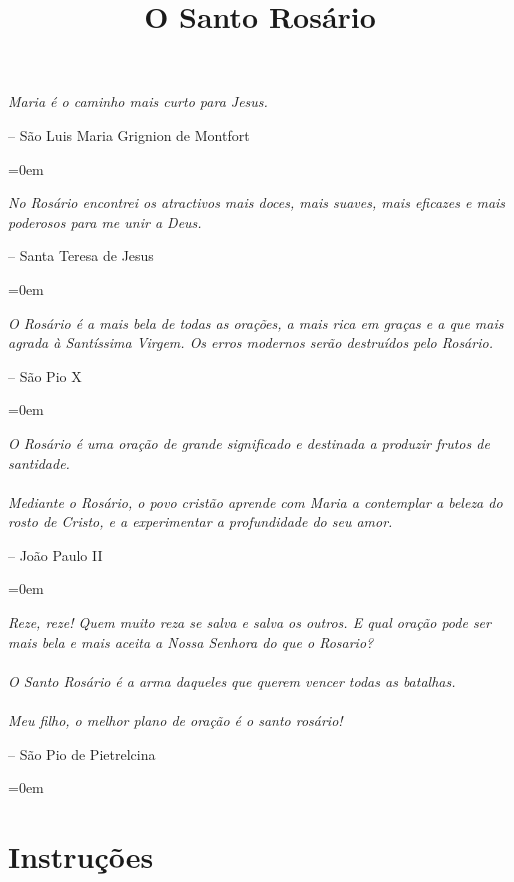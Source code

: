 \documentclass[10pt,a5paper]{book}
\newcommand{\epigraph}[2]{%
    \leftskip=0.3\textwidth \emph{#1}

    \leftskip=0.3\textwidth \hfill -- #2

    \leftskip=0em ~
}
\newenvironment{specialpage}{\mbox{} \vfill}{\vfill \mbox{}}
\begin{document}
\title{O Santo Rosário}
\author{}
\date{}

\pagestyle{empty}

\begin{specialpage}
    \begin{center}
        
    \end{center}
\end{specialpage}

\cleardoublepage

\begin{specialpage}
    \epigraph{Maria é o caminho mais curto para Jesus.}{São Luis Maria Grignion de Montfort}

    \vfill

    \epigraph{No Rosário encontrei os atractivos mais doces, mais suaves, mais eficazes e mais poderosos para me unir a Deus.}{Santa Teresa de Jesus}

    \epigraph{O Rosário é a mais bela de todas as orações, a mais rica em graças e a que mais agrada à Santíssima Virgem.
    Os erros modernos serão destruídos pelo Rosário.}{São Pio X}

    \vfill

    \epigraph{O Rosário é uma oração de grande significado e destinada a produzir frutos de santidade. \\ \\
    Mediante o Rosário, o povo cristão aprende com Maria a contemplar a beleza do rosto de Cristo, e a experimentar a profundidade do seu amor.}{João Paulo II}

    \vfill

    \epigraph{Reze, reze! Quem muito reza se salva e salva os outros.
    E qual oração pode ser mais bela e mais aceita a Nossa Senhora do que o Rosario? \\ \\
    O Santo Rosário é a arma daqueles que querem vencer todas as batalhas. \\ \\
    Meu filho, o melhor plano de oração é o santo rosário!}{São Pio de Pietrelcina}
\end{specialpage}

\cleardoublepage

\setcounter{page}{1}
\tableofcontents

\pagestyle{plain}


\chapter{Instruções}
\end{document}
